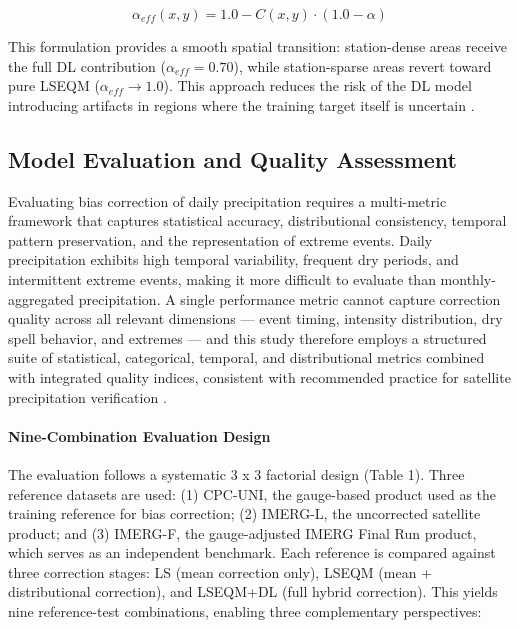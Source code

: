\documentclass[11pt,a4paper]{article}
\begin{document}
\begin{equation}\alpha_{eff}(x, y) = 1.0 - C(x, y) \cdot (1.0 - \alpha)\end{equation}

This formulation provides a smooth spatial transition: station-dense
areas receive the full DL contribution (\(\alpha_{eff} = 0.70\)), while
station-sparse areas revert toward pure LSEQM
(\(\alpha_{eff} \rightarrow 1.0\)). This approach reduces the risk of
the DL model introducing artifacts in regions where the training target
itself is uncertain \cite{ref27}.

\subsection{Model Evaluation and Quality
Assessment}\label{model-evaluation-and-quality-assessment}

Evaluating bias correction of daily precipitation requires a
multi-metric framework that captures statistical accuracy,
distributional consistency, temporal pattern preservation, and the
representation of extreme events. Daily precipitation exhibits high
temporal variability, frequent dry periods, and intermittent extreme
events, making it more difficult to evaluate than monthly-aggregated
precipitation. A single performance metric cannot capture correction
quality across all relevant dimensions --- event timing, intensity
distribution, dry spell behavior, and extremes --- and this study
therefore employs a structured suite of statistical, categorical,
temporal, and distributional metrics combined with integrated quality
indices, consistent with recommended practice for satellite
precipitation verification \cite{ref14,ref15}.

\paragraph{Nine-Combination Evaluation
Design}\label{nine-combination-evaluation-design}

The evaluation follows a systematic 3 x 3 factorial design (Table 1).
Three reference datasets are used: (1) CPC-UNI, the gauge-based product
used as the training reference for bias correction; (2) IMERG-L, the
uncorrected satellite product; and (3) IMERG-F, the gauge-adjusted IMERG
Final Run product, which serves as an independent benchmark. Each
reference is compared against three correction stages: LS (mean
correction only), LSEQM (mean + distributional correction), and LSEQM+DL
(full hybrid correction). This yields nine reference-test combinations,
enabling three complementary perspectives:
\end{document}
